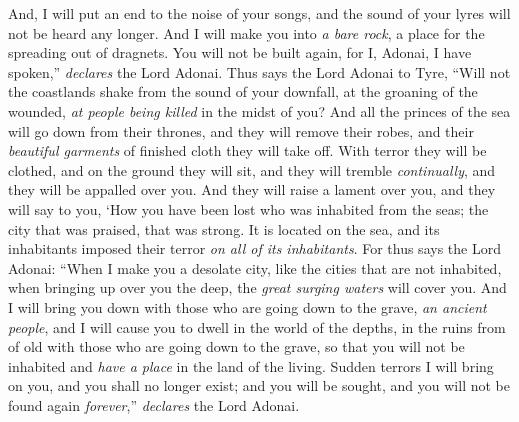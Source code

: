 \begin{biblechapter}
\verse And, I will put an end to the noise of your songs, and the sound of your lyres will not be heard any longer.
\verse And I will make you into \textit{a bare rock}, a place for the spreading out of dragnets. You will not be built again, for I, Adonai, I have spoken,” \textit{declares} the Lord Adonai.
\verse Thus says the Lord Adonai to Tyre, “Will not the coastlands shake from the sound of your downfall, at the groaning of the wounded, \textit{at people being killed} in the midst of you?
\verse And all the princes of the sea will go down from their thrones, and they will remove their robes, and their \textit{beautiful garments} of finished cloth they will take off. With terror they will be clothed, and on the ground they will sit, and they will tremble \textit{continually}, and they will be appalled over you.
\verse And they will raise a lament over you, and they will say to you,
\verse ‘How you have been lost who was inhabited from the seas; 
the city that was praised, that was strong. 
It is located on the sea, 
and its inhabitants imposed their terror \textit{on all of its inhabitants}.
\verse For thus says the Lord Adonai: “When I make you a desolate city, like the cities that are not inhabited, when bringing up over you the deep, the \textit{great surging waters} will cover you.
\verse And I will bring you down with those who are going down to the grave, \textit{an ancient people}, and I will cause you to dwell in the world of the depths, in the ruins from of old with those who are going down to the grave, so that you will not be inhabited and \textit{have a place} in the land of the living.
\verse Sudden terrors I will bring on you, and you shall no longer exist; and you will be sought, and you will not be found again \textit{forever},” \textit{declares} the Lord Adonai.
\end{biblechapter}

